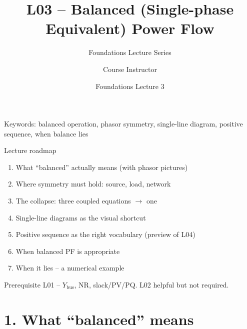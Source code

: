 \documentclass[aspectratio=169,10pt]{beamer}
\title[L03: Balanced PF]{L03 -- Balanced (Single-phase Equivalent) Power Flow}
\subtitle{Foundations Lecture Series}
\author{Course Instructor}
\institute{Microgrid 3-phase Security AI Project}
\date{Foundations Lecture 3}
\begin{document}
\begin{frame}
  \titlepage
  \vspace{-0.8em}
  \begin{center}
    \small Keywords: balanced operation, phasor symmetry, single-line diagram, positive sequence, when balance lies
  \end{center}
\end{frame}

\begin{frame}{Lecture roadmap}
\begin{enumerate}
  \item What ``balanced'' actually means (with phasor pictures)
  \item Where symmetry must hold: source, load, network
  \item The collapse: three coupled equations $\to$ one
  \item Single-line diagrams as the visual shortcut
  \item Positive sequence as the right vocabulary (preview of L04)
  \item When balanced PF is appropriate
  \item When it lies -- a numerical example
\end{enumerate}
\vspace{0.6em}
\begin{block}{Prerequisite}
L01 -- $Y_{\text{bus}}$, NR, slack/PV/PQ. L02 helpful but not required.
\end{block}
\end{frame}

\section*{1. What ``balanced'' means}
\end{document}
